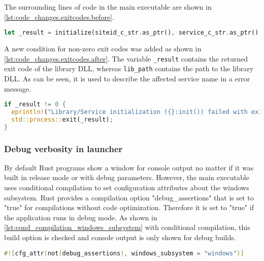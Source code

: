 The surrounding lines of code in the main executable are shown in \autoref{lst:code_changes.exitcodes.before}.
\begin{lstlisting}[label=lst:code_changes.exitcodes.before, caption={Former code snippet from main executable for calling the microservice library code in Rust (/Microservices/OpenTwin/src/main.rs)}, language=rust, firstnumber=85]
let _result = initialize(siteid_c_str.as_ptr(), service_c_str.as_ptr(), db_c_str.as_ptr(), dir_c_str.as_ptr());
\end{lstlisting}

A new condition for non-zero exit codes was added as shown in \autoref{lst:code_changes.exitcodes.after}. The variable \texttt{\_result}  contains the returned exit code of the library \ac{DLL}, whereas \texttt{lib\_path} contains the path to the library \ac{DLL}. As can be seen, it is used to describe the affected service name in a error message.
\begin{lstlisting}[label=lst:code_changes.exitcodes.after, caption={Code changes in Rust main executable for additional treatment of exit codes (/Microservices/OpenTwin/src/main.rs)}, language=rust, firstnumber=86]
if _result != 0 {
  eprintln!("Library/Service initialization ({}:init()) failed with exit code {}", lib_path, _result);
  std::process::exit(_result);
}
\end{lstlisting}

 
\subsubsection*{Debug verbosity in launcher}
By default Rust programs show a window for console output no matter if it was built in release mode or with debug parameters. However, the main executable uses conditional compilation to set configuration attributes about the windows subsystem.
Rust provides a compilation option "debug\_assertions" that is set to "true" for compilations without code optimization\cite{Rust.20230209}. Therefore it is set to "true" if the application runs in debug mode.
As shown in \autoref{lst:cond_compilation_windows_subsystem} with conditional compilation, this build option is checked and console output is only shown for debug builds.

\begin{lstlisting}[label=lst:cond_compilation_windows_subsystem, caption={Conditional compilation for disabling console output in non-debug builds (/Microservices/OpenTwin/src/main.rs)}, language=rust, firstnumber=2]
#![cfg_attr(not(debug_assertions), windows_subsystem = "windows")]
\end{lstlisting}

